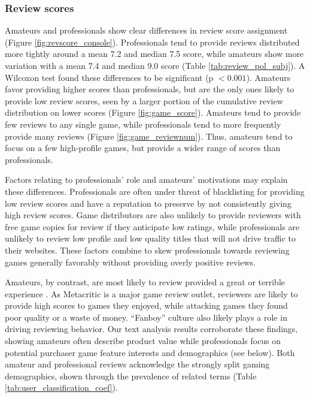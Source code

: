 \documentclass[letterpaper]{article}
\begin{document}
\subsubsection{Review scores}
Amateurs and professionals show clear differences in review score assignment (Figure \ref{fig:revscore_console}). Professionals tend to provide reviews distributed more tightly around a mean 7.2 and median 7.5 score, while amateurs show more variation with a mean 7.4 and median 9.0 score (Table \ref{tab:review_pol_subj}). A Wilcoxon test found these differences to be significant (p $< 0.001$). Amateurs favor providing higher scores than professionals, but are the only ones likely to provide low review scores, seen by a larger portion of the cumulative review distribution on lower scores (Figure \ref{fig:game_score}). Amateurs tend to provide few reviews to any single game, while professionals tend to more frequently provide many reviews (Figure \ref{fig:game_reviewnum}). Thus, amateurs tend to focus on a few high-profile games, but provide a wider range of scores than professionals. 

Factors relating to professionals' role and amateurs' motivations may explain these differences. Professionals are often under threat of blacklisting for providing low review scores and have a reputation to preserve by not consistently giving high review scores. Game distributors are also unlikely to provide reviewers with free game copies for review if they anticipate low ratings, while professionals are unlikely to review low profile and low quality titles that will not drive traffic to their websites. These factors combine to skew professionals towards reviewing games generally favorably without providing overly positive reviews. 

Amateurs, by contrast, are most likely to review provided a great or terrible experience \cite{gilbert2010deja}. As Metacritic is a major game review outlet, reviewers are likely to provide high scores to games they enjoyed, while attacking games they found poor quality or a waste of money. ``Fanboy'' culture also likely plays a role in driving reviewing behavior. Our text analysis results corroborate these findings, showing amateurs often describe product value while professionals focus on potential purchaser game feature interests and demographics (see below). Both amateur and professional reviews acknowledge the strongly split gaming demographics, shown through the prevalence of related terms (Table \ref{tab:user_classification_coef}). 
\end{document}
